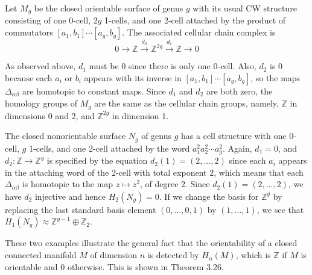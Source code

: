 \begin{example}
\label{ex:cellular-homology-spheres}
Let $M_g$ be the closed orientable surface of genus $g$ with its usual CW structure consisting of one 0-cell, $2g$ 1-cells, and one 2-cell attached by the product of commutators $[a_1, b_1] \cdots [a_g, b_g]$. The associated cellular chain complex is
\[
0 \to \mathbb{Z} \xrightarrow{d_2} \mathbb{Z}^{2g} \xrightarrow{d_1} \mathbb{Z} \to 0
\]
\end{example}

As observed above, $d_1$ must be $0$ since there is only one 0-cell. Also, $d_2$ is $0$ because each $a_i$ or $b_i$ appears with its inverse in $[a_1, b_1] \cdots [a_g, b_g]$, so the maps $\Delta_{\alpha\beta}$ are homotopic to constant maps. Since $d_1$ and $d_2$ are both zero, the homology groups of $M_g$ are the same as the cellular chain groups, namely, $\mathbb{Z}$ in dimensions 0 and 2, and $\mathbb{Z}^{2g}$ in dimension 1.

\begin{example}
\label{ex:cellular-homology-surfaces}
The closed nonorientable surface $N_g$ of genus $g$ has a cell structure with one 0-cell, $g$ 1-cells, and one 2-cell attached by the word $a_1^2 a_2^2 \cdots a_g^2$. Again, $d_1 = 0$, and $d_2: \mathbb{Z} \to \mathbb{Z}^g$ is specified by the equation $d_2(1) = (2, \ldots, 2)$ since each $a_i$ appears in the attaching word of the 2-cell with total exponent 2, which means that each $\Delta_{\alpha\beta}$ is homotopic to the map $z \mapsto z^2$, of degree 2. Since $d_2(1) = (2, \ldots, 2)$, we have $d_2$ injective and hence $H_2(N_g) = 0$. If we change the basis for $\mathbb{Z}^g$ by replacing the last standard basis element $(0, \ldots, 0, 1)$ by $(1, \ldots, 1)$, we see that $H_1(N_g) \approx \mathbb{Z}^{g-1} \oplus \mathbb{Z}_2$.
\end{example}

These two examples illustrate the general fact that the orientability of a closed connected manifold $M$ of dimension $n$ is detected by $H_n(M)$, which is $\mathbb{Z}$ if $M$ is orientable and $0$ otherwise. This is shown in Theorem 3.26.

